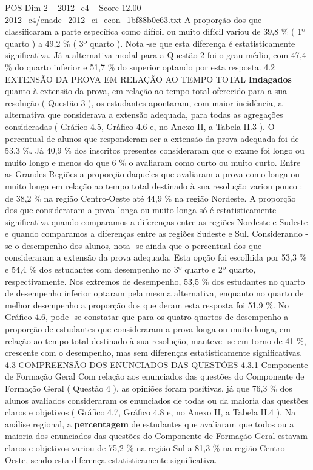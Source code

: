 \begin{textsample}{POS Dim 2 – 2012\_c4 – Score 12.00 – 2012\_c4/enade\_2012\_ci\_econ\_1bf88b0c63.txt}
A proporção dos que classificaram a parte específica como difícil ou muito difícil variou de 39,8 \% ( 1º quarto ) a 49,2 \% ( 3º quarto ).
Nota -se que esta diferença é estatisticamente significativa.
Já a alternativa modal para a Questão 2 foi o grau médio, com 47,4 \% do quarto inferior e 51,7 \% do superior optando por esta resposta. 4.2 EXTENSÃO DA PROVA EM RELAÇÃO AO TEMPO TOTAL \textbf{Indagados} quanto à extensão da prova, em relação ao tempo total oferecido para a sua resolução ( Questão 3 ), os estudantes apontaram, com maior incidência, a alternativa que considerava a extensão adequada, para todas as agregações consideradas ( Gráfico 4.5, Gráfico 4.6 e, no Anexo II, a Tabela II.3 ).
O percentual de alunos que responderam ser a extensão da prova adequada foi de 53,3 \%.
Já 40,9 \% dos inscritos presentes consideraram que o exame foi longo ou muito longo e menos do que 6 \% o avaliaram como curto ou muito curto.
Entre as Grandes Regiões a proporção daqueles que avaliaram a prova como longa ou muito longa em relação ao tempo total destinado à sua resolução variou pouco : de 38,2 \% na região Centro-Oeste até 44,9 \% na região Nordeste.
A proporção dos que consideraram a prova longa ou muito longa só é estatisticamente significativa quando comparamos a diferenças entre as regiões Nordeste e Sudeste e quando comparamos a diferenças entre as regiões Sudeste e Sul.
Considerando -se o desempenho dos alunos, nota -se ainda que o percentual dos que consideraram a extensão da prova adequada.
Esta opção foi escolhida por 53,3 \% e 54,4 \% dos estudantes com desempenho no 3º quarto e 2º quarto, respectivamente.
Nos extremos de desempenho, 53,5 \% dos estudantes no quarto de desempenho inferior optaram pela mesma alternativa, enquanto no quarto de melhor desempenho a proporção dos que deram esta resposta foi 51,9 \%.
No Gráfico 4.6, pode -se constatar que para os quatro quartos de desempenho a proporção de estudantes que consideraram a prova longa ou muito longa, em relação ao tempo total destinado à sua resolução, manteve -se em torno de 41 \%, crescente com o desempenho, mas sem diferenças estatisticamente significativas. 4.3 COMPREENSÃO DOS ENUNCIADOS DAS QUESTÕES 4.3.1 Componente de Formação Geral Com relação aos enunciados das questões do Componente de Formação Geral ( Questão 4 ), as opiniões foram positivas, já que 76,3 \% dos alunos avaliados consideraram os enunciados de todas ou da maioria das questões claros e objetivos ( Gráfico 4.7, Gráfico 4.8 e, no Anexo II, a Tabela II.4 ).
Na análise regional, a \textbf{percentagem} de estudantes que avaliaram que todos ou a maioria dos enunciados das questões do Componente de Formação Geral estavam claros e objetivos variou de 75,2 \% na região Sul a 81,3 \% na região Centro-Oeste, sendo esta diferença estatisticamente significativa.

\end{textsample}
